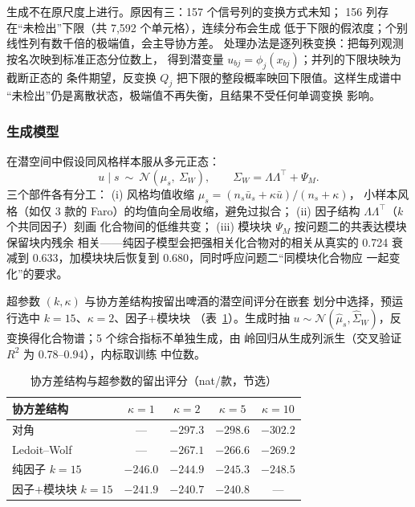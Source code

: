 \documentclass[12pt,a4paper]{article}
\begin{document}
生成不在原尺度上进行。原因有三：157 个信号列的变换方式未知；
156 列存在``未检出''下限（共 7{,}592 个单元格），连续分布会生成
低于下限的假浓度；个别线性列有数千倍的极端值，会主导协方差。
处理办法是逐列秩变换：把每列观测按名次映到标准正态分位数上，
得到潜变量 $u_{bj}=\phi_j(x_{bj})$；并列的下限块映为截断正态的
条件期望，反变换 $Q_j$ 把下限的整段概率映回下限值。这样生成谱中
``未检出''仍是离散状态，极端值不再失衡，且结果不受任何单调变换
影响。

\subsubsection{生成模型}

在潜空间中假设同风格样本服从多元正态：
\begin{equation}
  u\mid s\ \sim\ \mathcal N(\mu_s,\ \Sigma_W),\qquad
  \Sigma_W=\Lambda\Lambda^\top+\Psi_M .
\end{equation}
三个部件各有分工：
(i) 风格均值收缩 $\hat\mu_s=(n_s\bar u_s+\kappa\bar u)/(n_s+\kappa)$，
小样本风格（如仅 3 款的 Faro）的均值向全局收缩，避免过拟合；
(ii) 因子结构 $\Lambda\Lambda^\top$（$k$ 个共同因子）刻画
化合物间的低维共变；
(iii) 模块块 $\Psi_M$ 按问题二的共表达模块保留块内残余
相关——纯因子模型会把强相关化合物对的相关从真实的 0.724 衰减到
0.633，加模块块后恢复到 0.680，同时呼应问题二``同模块化合物应
一起变化''的要求。

超参数 $(k,\kappa)$ 与协方差结构按留出啤酒的潜空间评分在嵌套
划分中选择，预运行选中 $k=15$、$\kappa=2$、因子$+$模块块
（表~\ref{tab:q3_score}）。生成时抽 $u\sim\mathcal N(\hat\mu_s,
\hat\Sigma_W)$，反变换得化合物谱；5 个综合指标不单独生成，由
岭回归从生成列派生（交叉验证 $R^2$ 为 0.78--0.94），内标取训练
中位数。

\begin{table}[htbp]
  \centering\small
  \caption{协方差结构与超参数的留出评分（nat/款，节选）}
  \label{tab:q3_score}
  \begin{tabular}{lcccc}
    \toprule
    协方差结构 & $\kappa=1$ & $\kappa=2$ & $\kappa=5$ & $\kappa=10$ \\
    \midrule
    对角 & --- & $-297.3$ & $-298.6$ & $-302.2$ \\
    Ledoit--Wolf & --- & $-267.1$ & $-266.6$ & $-269.2$ \\
    纯因子 $k=15$ & $-246.0$ & $-244.9$ & $-245.3$ & $-248.5$ \\
    因子$+$模块块 $k=15$ & $-241.9$ & $\mathbf{-240.7}$ & $-240.8$ & --- \\
    \bottomrule
  \end{tabular}
\end{table}
\end{document}

